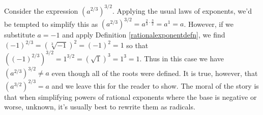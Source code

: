 \smallskip
 
Consider the expression $\left(a^{2/3}\right)^{3/2}$.  Applying the usual laws of exponents, we'd be tempted to simplify this as $\left(a^{2/3}\right)^{3/2} = a^{\frac{2}{3} \cdot \frac{3}{2}} = a^{1} = a$.  However, if we substitute $a=-1$ and apply Definition \ref{rationalexponentdefn}, we find $(-1)^{2/3} = \left(\sqrt[3]{-1}\right)^2 = (-1)^2 = 1$ so that $\left((-1)^{2/3}\right)^{3/2} = 1^{3/2} = \left(\sqrt{1}\right)^3 = 1^3 = 1$.  Thus in this case we have $\left(a^{2/3}\right)^{3/2} \neq a$ even though all of the roots were defined.  It is true, however, that $\left(a^{3/2}\right)^{2/3} = a$  and we leave this for the reader to show.  The moral of the story is that when simplifying powers of rational exponents where the base is negative or worse, unknown, it's usually best to rewrite them as radicals.

\medskip

